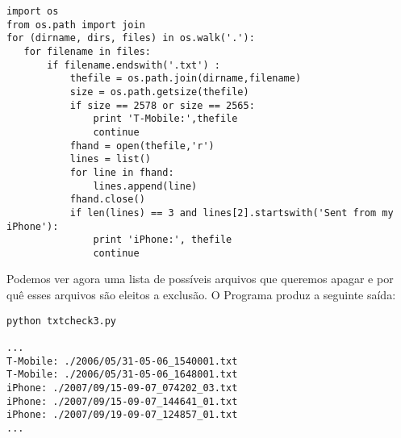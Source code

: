 \beforeverb
\begin{verbatim}
import os
from os.path import join
for (dirname, dirs, files) in os.walk('.'):
   for filename in files:
       if filename.endswith('.txt') :
           thefile = os.path.join(dirname,filename)
           size = os.path.getsize(thefile)
           if size == 2578 or size == 2565:
               print 'T-Mobile:',thefile
               continue
           fhand = open(thefile,'r')
           lines = list()
           for line in fhand:
               lines.append(line)
           fhand.close()
           if len(lines) == 3 and lines[2].startswith('Sent from my iPhone'):
               print 'iPhone:', thefile
               continue
\end{verbatim}
\afterverb

Podemos ver agora uma lista de possíveis arquivos que queremos apagar e por quê esses arquivos
são eleitos a exclusão.
O Programa produz a seguinte saída:

\beforeverb
\begin{verbatim}
python txtcheck3.py

...
T-Mobile: ./2006/05/31-05-06_1540001.txt
T-Mobile: ./2006/05/31-05-06_1648001.txt
iPhone: ./2007/09/15-09-07_074202_03.txt
iPhone: ./2007/09/15-09-07_144641_01.txt
iPhone: ./2007/09/19-09-07_124857_01.txt
...
\end{verbatim}
\afterverb


